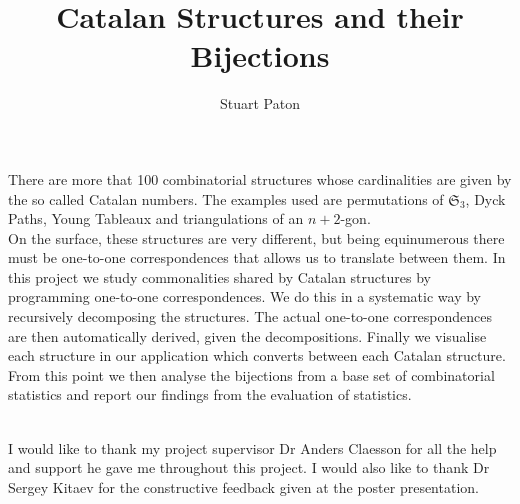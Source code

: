 \documentclass[12pt]{article}
\begin{document}
\title{Catalan Structures and their Bijections}
\author{Stuart Paton}

\maketitle
\thispagestyle{empty}


\begin{Abstract}
There are more that 100 combinatorial structures whose cardinalities are given by the so called Catalan numbers. The examples used are permutations of $\mathfrak{S}_3$, Dyck Paths, Young Tableaux and triangulations of an $n+2$-gon.\\
On the surface, these structures are very different, but being equinumerous there must be one-to-one correspondences that allows us 
to translate between them. In this project we study commonalities shared by Catalan structures by programming one-to-one 
correspondences. We do this in a systematic way by recursively decomposing the structures. The actual one-to-one correspondences are 
then automatically derived, given the decompositions. Finally we visualise each structure in our application which converts between each Catalan structure.\\ 
From this point we then analyse the bijections from a base set of combinatorial statistics and report our findings from the evaluation of statistics. 
\end{Abstract}
\clearpage

\par
{\\ }
I would like to thank my project supervisor Dr Anders Claesson for all the help and support he gave me throughout this project. I would also like to thank Dr Sergey Kitaev for the constructive feedback given at the poster presentation.
\clearpage

\tableofcontents
\newpage


\end{document}
